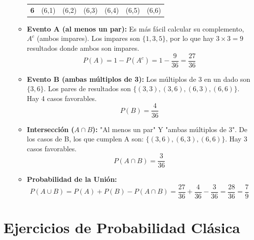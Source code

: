 \documentclass[12pt, letterpaper]{article}
\begin{document}
\begin{enumerate}
\begin{itemize}
\begin{center}
\begin{tabular}{c|cccccc}
				            \textbf{6} & (6,1)      & (6,2)      & (6,3)      & (6,4)      & (6,5)      & (6,6)      \\
			            \end{tabular}
		            \end{center}
		      \item \textbf{Evento A (al menos un par):} Es más fácil calcular su complemento, $A^c$ (ambos impares). Los impares son $\{1,3,5\}$, por lo que hay $3 \times 3 = 9$ resultados donde ambos son impares.
		            \[ P(A) = 1 - P(A^c) = 1 - \frac{9}{36} = \frac{27}{36} \]
		      \item \textbf{Evento B (ambas múltiplos de 3):} Los múltiplos de 3 en un dado son $\{3,6\}$. Los pares de resultados son $\{(3,3), (3,6), (6,3), (6,6)\}$. Hay 4 casos favorables.
		            \[ P(B) = \frac{4}{36} \]
		      \item \textbf{Intersección ($A \cap B$):} "Al menos un par" Y "ambas múltiplos de 3". De los casos de B, los que cumplen A son: $\{(3,6), (6,3), (6,6)\}$. Hay 3 casos favorables.
		            \[ P(A \cap B) = \frac{3}{36} \]
		      \item \textbf{Probabilidad de la Unión:}
		            \[ P(A \cup B) = P(A) + P(B) - P(A\cap B) = \frac{27}{36} + \frac{4}{36} - \frac{3}{36} = \frac{28}{36} = \frac{7}{9} \]
	      \end{itemize}
\end{enumerate}
\newpage


\section{Ejercicios de Probabilidad Clásica}
\end{document}
